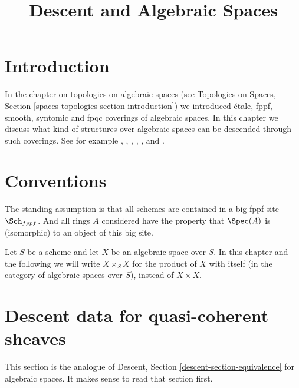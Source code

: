 

%


\title{Descent and Algebraic Spaces}

\maketitle

\label{section-phantom}

\tableofcontents

\section{Introduction}
\label{section-introduction}

\noindent
In the chapter on topologies on algebraic spaces (see
Topologies on Spaces, Section \ref{spaces-topologies-section-introduction})
we introduced \'etale, fppf, smooth, syntomic and fpqc coverings of
algebraic spaces.
In this chapter we discuss what kind of structures over algebraic spaces
can be descended through such coverings.
See for example \cite{Gr-I}, \cite{Gr-II}, \cite{Gr-III},
\cite{Gr-IV}, \cite{Gr-V}, and \cite{Gr-VI}.



\section{Conventions}
\label{section-conventions}

\noindent
The standing assumption is that all schemes are contained in
a big fppf site $\Sch_{fppf}$. And all rings $A$ considered
have the property that $\Spec(A)$ is (isomorphic) to an
object of this big site.

\medskip\noindent
Let $S$ be a scheme and let $X$ be an algebraic space over $S$.
In this chapter and the following we will write $X \times_S X$
for the product of $X$ with itself (in the category of algebraic
spaces over $S$), instead of $X \times X$.






\section{Descent data for quasi-coherent sheaves}
\label{section-equivalence}

\noindent
This section is the analogue of
Descent, Section \ref{descent-section-equivalence}
for algebraic spaces.
It makes sense to read that section first.

